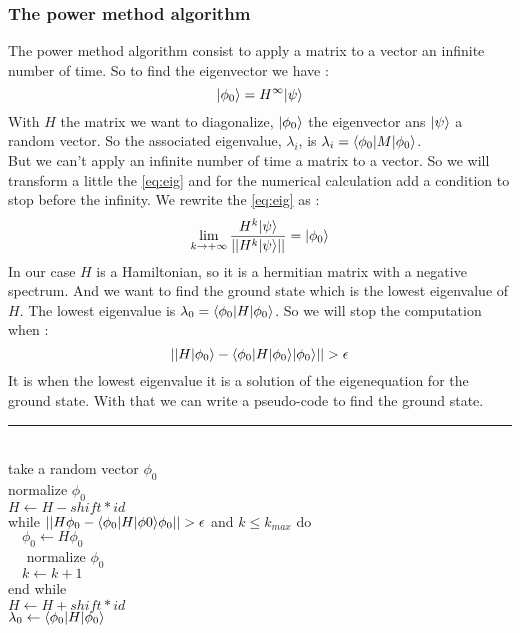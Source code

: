 \documentclass[1pt, a4paper]{article}
\begin{document}
\subsubsection{The power method algorithm}
\label{subs:pow}
\noindent
The power method algorithm consist to apply a matrix to a vector an infinite number of time. So to find the eigenvector we have :
\begin{equation}
\label{eq:eig}
    \ket{\phi_0} = H^{\infty}\ket{\psi}
\end{equation}
With $H$ the matrix we want to diagonalize, $\ket{\phi_0}$ the eigenvector ans $\ket{\psi}$ a random vector. So the associated eigenvalue, $\lambda_i$, is $\lambda_i = \Braket{\phi_0}{M}{\phi_0}$.\\
But we can't apply an infinite number of time a matrix to a vector. So we will transform a little the \autoref{eq:eig} and for the numerical calculation add a condition to stop before the infinity. We rewrite the \autoref{eq:eig} as :
\begin{equation}
    \lim_{k\rightarrow +\infty} \dfrac{H^k\ket{\psi}}{||H^k\ket{\psi}||} = \ket{\phi_0}
\end{equation}
In our case $H$ is a Hamiltonian, so it is a hermitian matrix with a negative spectrum. And we want to find the ground state which is the lowest eigenvalue of $H$. The lowest eigenvalue is $\lambda_0 = \Braket{\phi_0}{H}{\phi_0}$. So we will stop the computation when :
\begin{equation}
    ||H\ket{\phi_0} - \Braket{\phi_0}{H}{\phi_0}\ket{\phi_0}|| > \epsilon
\end{equation}
It is when the lowest eigenvalue it is a solution of the eigenequation for the ground state. With that we can write a pseudo-code to find the ground state.\\
\hrule
\noindent
\\
take a random vector $\phi_0$\\
normalize $\phi_0$\\
$H \leftarrow H - shift * id$\\
while $||H\phi_0 - \Braket{\phi_0}{H}{\phi 0}\phi_0|| > \epsilon$ and $k\leq k_{max}$ do\\
$\quad \phi_0 \leftarrow H\phi_0$\\
$\quad$ normalize $\phi_0$\\
$\quad k \leftarrow k + 1$\\
end while\\
$H \leftarrow H + shift * id$\\
$\lambda_0 \leftarrow \Braket{\phi_0}{H}{\phi_0}$\\
\end{document}
